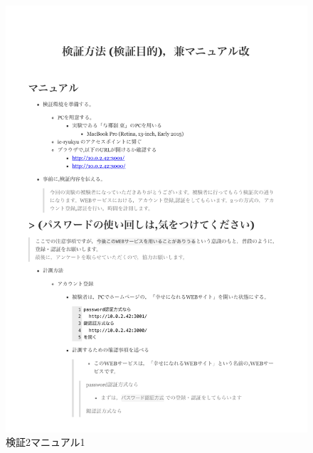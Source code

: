     \newpage
    \vspace{4cm}%
    \begin{figure}[H]
        \includegraphics[width=15cm]{./fig/chapter4/inspect_2/manual/manual_1.pdf}
        \caption{検証2マニュアル1}
        \label{検証２マニュアル１}
    \end{figure}

